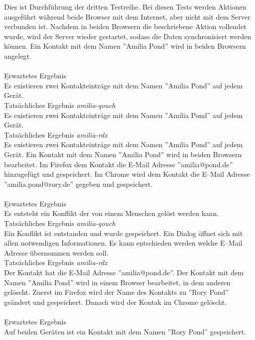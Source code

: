 Dies ist Durchführung der dritten Testreihe.
Bei diesen Tests werden Aktionen ausgeführt während beide Browser mit dem Internet, aber nicht mit dem Server verbunden ist.
Nachdem in beiden Browsern die beschriebene Aktion vollendet wurde, wird der Server wieder gestartet, sodass die Daten synchronisiert werden können. 
%
Ein Kontakt mit dem Namen ''Amilia Pond'' wird in beiden Browsern angelegt.\\\\
\b{Erwartetes Ergebnis}\\
Es existieren zwei Kontakteinträge mit dem Namen ''Amilia Pond'' auf jedem Gerät.\\
\b{Tatsächliches Ergebnis \it{amilia-qouch}}\\
Es existieren zwei Kontakteinträge mit dem Namen ''Amilia Pond'' auf jedem Gerät.\\
\b{Tatsächliches Ergebnis \it{amilia-rdx}}\\
Es existieren zwei Kontakteinträge mit dem Namen ''Amilia Pond'' auf jedem Gerät.
%
Ein Kontakt mit dem Namen ''Amilia Pond'' wird in beiden Browsern bearbeitet. Im Firefox dem Kontakt die E-Mail Adresse ''amilia@pond.de'' hinzugefügt und gespeichert.
Im Chrome wird dem Kontakt die E--Mail Adresse ''amilia.pond@rory.de'' gegeben und gespeichert.\\\\
\b{Erwartetes Ergebnis}\\
Es entsteht ein Konflikt der von einem Menschen gelöst werden kann.\\
\b{Tatsächliches Ergebnis \it{amilia-qouch}}\\
Ein Konflikt ist entstanden und wurde gespeichert. Ein Dialog öffnet sich mit allen notwendigen Informationen.
Es kann entschieden werden welche E--Mail Adresse übernommen werden soll.\\
\b{Tatsächliches Ergebnis \it{amilia-rdx}}\\
Der Kontakt hat die E-Mail Adresse ''amilia@pond.de''.
%
Der Kontakt mit dem Namen ''Amilia Pond'' wird in einem Browser bearbeitet, in dem anderen gelöscht.
Zuerst im Firefox wird der Name des Kontakts zu ''Rory Pond'' geändert und gespeichert.
Danach wird der Kontak im Chrome gelöscht.\\\\
\b{Erwartetes Ergebnis}\\
Auf beiden Geräten ist ein Kontakt mit dem Namen ''Rory Pond'' gespeichert.\\
